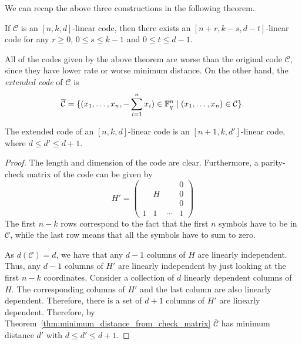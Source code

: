 \documentclass[../main.tex]{subfiles}
\begin{document}
We can recap the above three constructions in the following theorem.

\begin{theorem}
If $\mathcal{C}$ is an $[n, k, d]$-linear code, then there exists an $[n + r, k - s, d - t]$-linear code for any $r \geq 0$, $0 \leq s \leq k - 1$ and $0 \leq t \leq d - 1$.
\end{theorem}

All of the codes given by the above theorem are worse than the original code $\mathcal{C}$, since they have lower rate or worse minimum distance. On the other hand, the \emph{extended code} of $\mathcal{C}$ is
\begin{equation*}
    \overline{\mathcal{C}} = \{ (x_1, \dots, x_n, -\sum_{i=1}^n x_i) \in \mathbb{F}_q^n \mid (x_1, \dots, x_n) \in \mathcal{C} \}.
\end{equation*}

\begin{theorem}
The extended code of an $[n, k, d]$-linear code is an $[n + 1, k, d']$-linear code, where $d \leq d' \leq d + 1$.
\end{theorem}

\begin{proof}
The length and dimension of the code are clear. Furthermore, a parity-check matrix of the code can be given by
\begin{equation*}
    H' = \begin{pmatrix}
        & & & 0 \\
        & H & & 0 \\
        & & & 0 \\
        1 & 1 & \cdots & 1
    \end{pmatrix}
\end{equation*}
The first $n - k$ rows correspond to the fact that the first $n$ symbols have to be in $\mathcal{C}$, while the last row means that all the symbols have to sum to zero.

As $d(\mathcal{C}) = d$, we have that any $d - 1$ columns of $H$ are linearly independent. Thus, any $d - 1$ columns of $H'$ are linearly independent by just looking at the first $n - k$ coordinates. Consider a collection of $d$ linearly dependent columns of $H$. The corresponding columns of $H'$ and the last column are also linearly dependent. Therefore, there is a set of $d + 1$ columns of $H'$ are linearly dependent. Therefore, by Theorem~\ref{thm:minimum_distance_from_check_matrix} $\overline{\mathcal{C}}$ has minimum distance $d'$ with $d \leq d' \leq d + 1$.
\end{proof}
\end{document}
